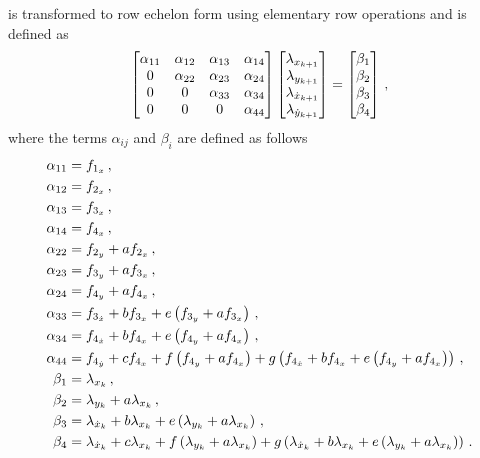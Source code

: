 \documentclass[letterpaper, paper,11pt]{AAS}		%
\begin{document}
 is transformed to row echelon form using elementary row operations and is defined as
\begin{align}\label{eq:costate_ref}
	\begin{bmatrix} 
		\alpha_{11} & \alpha_{12} & \alpha_{13} & \alpha_{14} \\
		0 & \alpha_{22} & \alpha_{23} & \alpha_{24} \\
		0 & 0 & \alpha_{33} & \alpha_{34} \\
		0 & 0 & 0 & \alpha_{44}
	\end{bmatrix}
	\begin{bmatrix} \lambda_{\xkp} \\ \lambda_{\ykp} \\ \lambda_{\xdotkp} \\ \lambda_{\ydotkp} \end{bmatrix}
	=
	\begin{bmatrix} \beta_1 \\ \beta_2 \\ \beta_3 \\ \beta_4 \end{bmatrix} \, ,
\end{align}
where the terms \( \alpha_{ij} \) and \( \beta_{i} \) are defined as follows
\begin{subequations}
\begin{align}
	\alpha_{11} &= f_{1_x} \, ,\\
	\alpha_{12} &= f_{2_x} \, ,\\
	\alpha_{13} &= f_{3_x} \, ,\\
	\alpha_{14} &= f_{4_x} \, ,\\
	\alpha_{22} &= f_{2_y} + a f_{2_x} \, ,\\
	\alpha_{23} &= f_{3_y} + af_{3_x} \, ,\\
	\alpha_{24} &= f_{4_y} + a f_{4_x} \, ,\\
	\alpha_{33} &= f_{3_{\dot x}} + b f_{3_x} + e \left( f_{3_y} + a f_{3_x} \right)\, ,\\
	\alpha_{34} &= f_{4_{\dot x}} + b f_{4_x} + e \left( f_{4_y} + a f_{4_x} \right) \, ,\\
	\alpha_{44} &= f_{4_{\dot y}} + c f_{4_x} + f \left( f_{4_y} + a f_{4_x} \right) + g \left( f_{4_{\dot x}} + b f_{4_x} + e \left( f_{4_y} + a f_{4_x} \right) \right) \, ,\\
	\beta_1 &= \lambda_{x_k} \, ,\\
	\beta_2 &= \lambda_{y_{k}} + a \lambda_{x_k} \, ,\\
	\beta_3 &= \lambda_{\dot{x}_{k}} + b \lambda_{x_k} + e \left( \lambda_{y_{k}} + a \lambda_{x_k} \right) \, ,\\
	\beta_4 &= \lambda_{\dot{x}_{k}} + c \lambda_{x_k} + f \left( \lambda_{y_{k}}+a \lambda_{x_k} \right) + g \left( \lambda_{\dot{x}_{k}} + b \lambda_{x_k} + e \left( \lambda_{y_{k}} + a \lambda_{x_k} \right) \right) \, .
\end{align}
\end{subequations}
\end{document}
